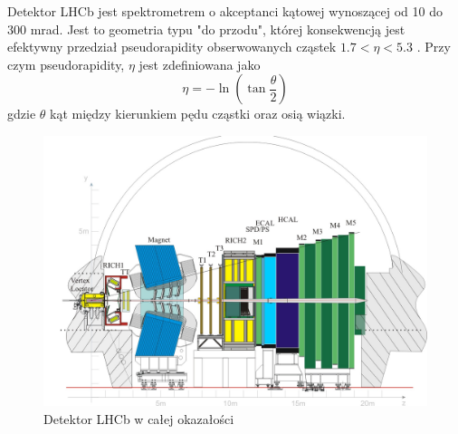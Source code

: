 Detektor LHCb jest spektrometrem o akceptanci kątowej wynoszącej od 10 do 300 mrad. Jest to geometria typu "do przodu", której konsekwencją jest efektywny przedział pseudorapidity obserwowanych cząstek $1.7<\eta < 5.3$ . Przy czym pseudorapidity, $\eta $ jest zdefiniowana jako
\begin{equation}
 \eta=-\ln\left(\tan\frac{\theta}{2}\right)
\end{equation}
gdzie $\theta$ kąt między kierunkiem pędu cząstki oraz osią wiązki.


\begin{figure}[h]  \centering
  \includegraphics[scale=0.6]{rozdzial2/Lhcbview.jpg}
  \caption{Detektor LHCb w całej okazałości \cite{public}}
  \label{fig:Layout}
\end{figure}

